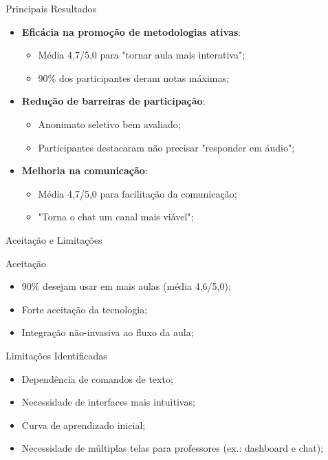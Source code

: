 \documentclass[aspectratio=169]{beamer}
\begin{document}
{\begin{frame}{Principais Resultados}
  \begin{itemize}
  \item \textbf{Eficácia na promoção de metodologias ativas}:
    \begin{itemize}
    \item Média 4,7/5,0 para "tornar aula mais interativa";
    \item 90\% dos participantes deram notas máximas;
    \end{itemize}
  \item \textbf{Redução de barreiras de participação}:
    \begin{itemize}
    \item Anonimato seletivo bem avaliado;
    \item Participantes destacaram não precisar "responder em áudio";
    \end{itemize}
  \item \textbf{Melhoria na comunicação}:
    \begin{itemize}
    \item Média 4,7/5,0 para facilitação da comunicação;
    \item "Torna o chat um canal mais viável";
    \end{itemize}
  \end{itemize}
\end{frame}

\begin{frame}{Aceitação e Limitações}
  \begin{block}{Aceitação}
  \begin{itemize}
  \item 90\% desejam usar em mais aulas (média 4,6/5,0);
  \item Forte aceitação da tecnologia;
  \item Integração não-invasiva ao fluxo da aula;
  \end{itemize}
  \end{block}
  
  \begin{block}{Limitações Identificadas}
  \begin{itemize}
  \item Dependência de comandos de texto;
  \item Necessidade de interfaces mais intuitivas;
  \item Curva de aprendizado inicial;
  \item Necessidade de múltiplas telas para professores (ex.: dashboard e chat);
  \end{itemize}
  \end{block}
\end{frame}

}
\end{document}
